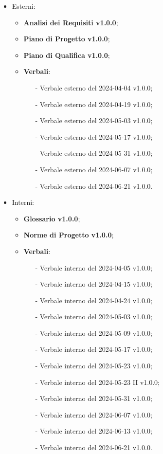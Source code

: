 \documentclass[8pt]{article}
\begin{document}
\begin{itemize}
    \item Esterni:
\begin{itemize}
    \item \textbf{Analisi dei Requisiti v1.0.0};
    \item \textbf{Piano di Progetto v1.0.0};
    \item \textbf{Piano di Qualifica v1.0.0};
    \item \textbf{Verbali}:
    \begin{itemize}
			\item[-] Verbale esterno del 2024-04-04 v1.0.0;
			\item[-] Verbale esterno del 2024-04-19 v1.0.0;
			\item[-] Verbale esterno del 2024-05-03 v1.0.0;
			\item[-] Verbale esterno del 2024-05-17 v1.0.0;
			\item[-] Verbale esterno del 2024-05-31 v1.0.0;
                        \item[-] Verbale esterno del 2024-06-07 v1.0.0;
			\item[-] Verbale esterno del 2024-06-21 v1.0.0.
    \end{itemize}
\end{itemize}
    \item Interni:
\begin{itemize}
    \item \textbf{Glossario v1.0.0};
    \item \textbf{Norme di Progetto v1.0.0};
    \item \textbf{Verbali}:
    \begin{itemize}
			\item[-] Verbale interno del 2024-04-05 v1.0.0;
			\item[-] Verbale interno del 2024-04-15 v1.0.0;
			\item[-] Verbale interno del 2024-04-24 v1.0.0;	
			\item[-] Verbale interno del 2024-05-03 v1.0.0;
			\item[-] Verbale interno del 2024-05-09 v1.0.0;
			\item[-] Verbale interno del 2024-05-17 v1.0.0;
			\item[-] Verbale interno del 2024-05-23 v1.0.0;
      			\item[-] Verbale interno del 2024-05-23 II v1.0.0; 
			\item[-] Verbale interno del 2024-05-31 v1.0.0;
			\item[-] Verbale interno del 2024-06-07 v1.0.0;
   			\item[-] Verbale interno del 2024-06-13 v1.0.0;
      			\item[-] Verbale interno del 2024-06-21 v1.0.0.
   
    \end{itemize}
\end{itemize}
\end{itemize}
\end{document}
